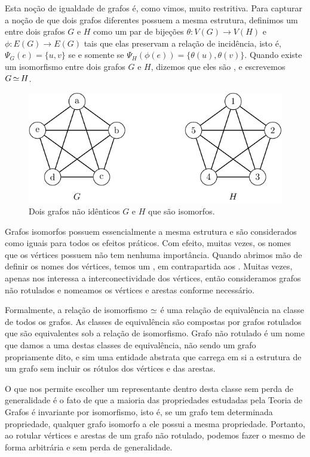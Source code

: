 Esta noção de igualdade de grafos é, como vimos, muito restritiva. Para capturar a noção de que dois grafos diferentes possuem a mesma estrutura, definimos um  entre dois grafos $G$ e $H$ como um par de bijeções $\theta : V(G) \to V(H)$ e $\phi : E(G) \to E(G)$ tais que elas preservam a relação de incidência, isto é, $\Psi_G(e) = \{u,v\}$ se e somente se $\Psi_H(\phi(e)) = \{\theta(u),\theta(v)\}$. Quando existe um isomorfismo entre dois grafos $G$ e $H$, dizemos que eles são , e escrevemos $G \operatorname{\simeq} H$.

\begin{figure}[ht!]
\centering
\includegraphics{figures/1_intro_2_iso}
\caption{Dois grafos não idênticos $G$ e $H$ que são isomorfos.}
\label{fig:intro:iso}
\end{figure}

Grafos isomorfos possuem essencialmente a mesma estrutura e são considerados como iguais para todos os efeitos práticos. Com efeito, muitas vezes, os nomes que os vértices possuem não tem nenhuma importância. Quando abrimos mão de definir os nomes dos vértices, temos um , em contrapartida aos . Muitas vezes, apenas nos interessa a interconectividade dos vértices, então consideramos grafos não rotulados e nomeamos os vértices e arestas conforme necessário.

Formalmente, a relação de isomorfismo $\operatorname{\simeq}$ é uma relação de equivalência na classe de todos os grafos. As classes de equivalência são compostas por grafos rotulados que são equivalentes sob a relação de isomorfismo. Grafo não rotulado é um nome que damos a uma destas classes de equivalência, não sendo um grafo propriamente dito, e sim uma entidade abstrata que carrega em si a estrutura de um grafo sem incluir os rótulos dos vértices e das arestas.

O que nos permite escolher um representante dentro desta classe sem perda de generalidade é o fato de que a maioria das propriedades estudadas pela Teoria de Grafos é invariante por isomorfismo, isto é, se um grafo tem determinada propriedade, qualquer grafo isomorfo a ele possui a mesma propriedade. Portanto, ao rotular vértices e arestas de um grafo não rotulado, podemos fazer o mesmo de forma arbitrária e sem perda de generalidade.

